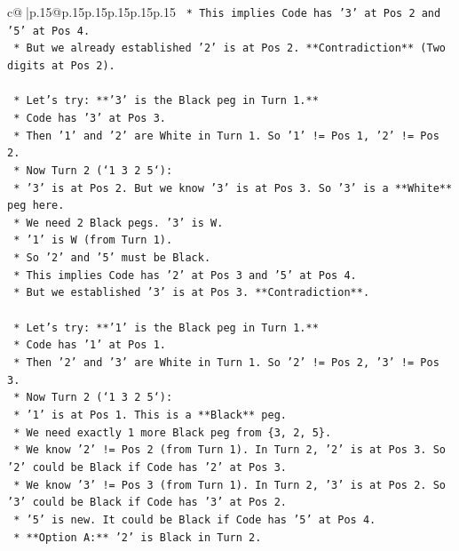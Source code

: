 \documentclass{article}
\begin{document}
{\begin{supertabular}{c@{$\;$}|p{.15\linewidth}@{}p{.15\linewidth}p{.15\linewidth}p{.15\linewidth}p{.15\linewidth}p{.15\linewidth}}
{{{\texttt{                *   This implies Code has '3' at Pos 2 and '5' at Pos 4.} \\
\texttt{                *   But we already established '2' is at Pos 2. **Contradiction** (Two digits at Pos 2).} \\
\\ 
\texttt{    *   Let's try: **'3' is the Black peg in Turn 1.**} \\
\texttt{        *   Code has '3' at Pos 3.} \\
\texttt{        *   Then '1' and '2' are White in Turn 1. So '1' != Pos 1, '2' != Pos 2.} \\
\texttt{        *   Now Turn 2 (`1 3 2 5`):} \\
\texttt{            *   '3' is at Pos 2. But we know '3' is at Pos 3. So '3' is a **White** peg here.} \\
\texttt{            *   We need 2 Black pegs. '3' is W.} \\
\texttt{            *   '1' is W (from Turn 1).} \\
\texttt{            *   So '2' and '5' must be Black.} \\
\texttt{            *   This implies Code has '2' at Pos 3 and '5' at Pos 4.} \\
\texttt{            *   But we established '3' is at Pos 3. **Contradiction**.} \\
\\ 
\texttt{    *   Let's try: **'1' is the Black peg in Turn 1.**} \\
\texttt{        *   Code has '1' at Pos 1.} \\
\texttt{        *   Then '2' and '3' are White in Turn 1. So '2' != Pos 2, '3' != Pos 3.} \\
\texttt{        *   Now Turn 2 (`1 3 2 5`):} \\
\texttt{            *   '1' is at Pos 1. This is a **Black** peg.} \\
\texttt{            *   We need exactly 1 more Black peg from \{3, 2, 5\}.} \\
\texttt{            *   We know '2' != Pos 2 (from Turn 1). In Turn 2, '2' is at Pos 3. So '2' could be Black if Code has '2' at Pos 3.} \\
\texttt{            *   We know '3' != Pos 3 (from Turn 1). In Turn 2, '3' is at Pos 2. So '3' could be Black if Code has '3' at Pos 2.} \\
\texttt{            *   '5' is new. It could be Black if Code has '5' at Pos 4.} \\
\texttt{            *   **Option A:** '2' is Black in Turn 2.} \\
}}}
\end{supertabular}}
\end{document}
